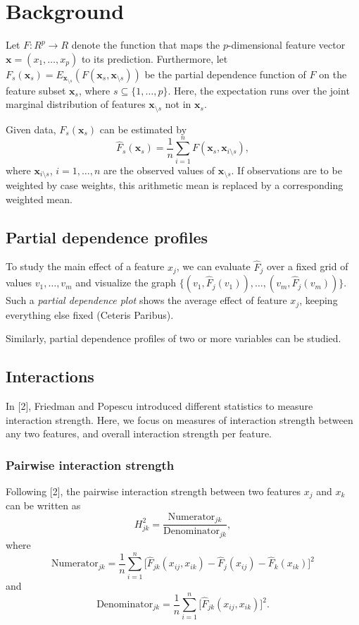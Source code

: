 \documentclass[]{article}
\title{}
\author{}
\begin{document}
\section{Background}
Let $F: R^p \to R$ denote the function that maps the $p$-dimensional feature vector $\mathbf{x} = (x_1, \dots, x_p)$ to its prediction.
Furthermore, let $F_s(\mathbf{x}_s) = E_{\mathbf{x}_{\setminus s}}(F(\mathbf{x}_s, \mathbf{x}_{\setminus s}))$ be the partial dependence function of $F$ on the feature subset $\mathbf{x}_s$, where $s \subseteq \{1, \dots, p\}$. Here, the expectation runs over the joint marginal distribution of features $\mathbf{x}_{\setminus s}$ not in $\mathbf{x}_s$.

Given data, $F_s(\mathbf{x}_s)$ can be estimated by
$$
  \hat F_s(\mathbf{x}_s) = \frac{1}{n} \sum_{i = 1}^n F(\mathbf{x}_s, \mathbf{x}_{i\setminus s}),
$$
where $\mathbf{x}_{i\setminus s}$, $i = 1, \dots, n$ are the observed values of $\mathbf{x}_{\setminus s}$. If observations are to be weighted by case weights, this arithmetic mean is replaced by a corresponding weighted mean.

\subsection{Partial dependence profiles}

To study the main effect of a feature $x_j$, we can evaluate $\hat F_j$ over a fixed grid of values $v_1, \dots, v_m$ and visualize the graph $\{(v_1, \hat F_j(v_1)), \dots, (v_m, \hat F_j(v_m))\}$. Such a {\em partial dependence plot} shows the average effect of feature $x_j$, keeping everything else fixed (Ceteris Paribus). 

Similarly, partial dependence profiles of two or more variables can be studied.

\subsection{Interactions}

In [2], Friedman and Popescu introduced different statistics to measure interaction strength. Here, we focus on measures of interaction strength between any two features, and overall interaction strength per feature.

\subsubsection{Pairwise interaction strength}
Following [2], the pairwise interaction strength between two features $x_j$ and $x_k$ can be written as
$$
	H_{jk}^2 = \frac{\textrm{Numerator}_{jk}}{\textrm{Denominator}_{jk}},
$$
where 
$$
  {\textrm{Numerator}_{jk}} = \frac{1}{n} \sum_{i = 1}^n\big[\hat F_{jk}(x_{ij}, x_{ik}) - \hat F_j(x_{ij}) - \hat F_k(x_{ik})\big]^2
$$
and
$$
  {\textrm{Denominator}_{jk}} = \frac{1}{n} \sum_{i = 1}^n\big[\hat F_{jk}(x_{ij}, x_{ik})\big]^2.
$$
\end{document}
